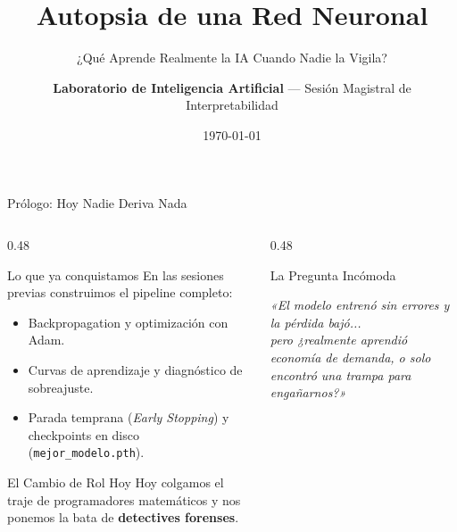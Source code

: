 \documentclass[10pt,aspectratio=169]{beamer}
\title{Autopsia de una Red Neuronal}
\subtitle{¿Qué Aprende Realmente la IA Cuando Nadie la Vigila?}
\author{\textbf{Laboratorio de Inteligencia Artificial} --- Sesión Magistral de Interpretabilidad}
\date{\today}
\institute{Deep Learning, Diagnóstico Forense y Límites de la IA}
\begin{document}
\begin{frame}
  \titlepage
\end{frame}

\begin{frame}{Prólogo: Hoy Nadie Deriva Nada}
  \begin{columns}[T]
    \begin{column}{0.48\textwidth}
      \begin{block}{Lo que ya conquistamos}
        \scriptsize
        En las sesiones previas construimos el pipeline completo:
        \begin{itemize}
          \item Backpropagation y optimización con Adam.
          \item Curvas de aprendizaje y diagnóstico de sobreajuste.
          \item Parada temprana (\textit{Early Stopping}) y checkpoints en disco (\texttt{mejor\_modelo.pth}).
        \end{itemize}
      \end{block}

      \vspace{-0.1cm}
      \begin{block}{El Cambio de Rol Hoy}
        \scriptsize
        Hoy colgamos el traje de programadores matemáticos y nos ponemos la bata de \textbf{detectives forenses}.
      \end{block}
    \end{column}

    \begin{column}{0.48\textwidth}
      \begin{alertblock}{La Pregunta Incómoda}
        \scriptsize
        \begin{center}
          \textit{«El modelo entrenó sin errores y la pérdida bajó... \\ pero ¿realmente aprendió economía de demanda, o solo encontró una trampa para engañarnos?»}
        \end{center}
      \end{alertblock}


\end{column}
\end{columns}
\end{frame}
\end{document}
